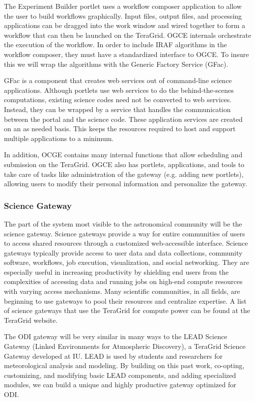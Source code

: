 \documentclass[10pt,conference]{IEEEtran}
\begin{document}
The Experiment Builder portlet uses a workflow composer application to allow the user to build workflows graphically. Input files, output files, and processing applications can be dragged into the work window and wired together to form a workflow that can then be launched on the TeraGrid. OGCE internals orchestrate the execution of the workflow. In order to include IRAF algorithms in the workflow composer, they must have a standardized interface to OGCE. To insure this we will wrap the algorithms with the Generic Factory Service (GFac).
 
GFac is a component that creates web services out of command-line science applications. Although portlets use web services to do the behind-the-scenes computations, existing science codes need not be converted to web services. Instead, they can be wrapped by a service that handles the communication between the portal and the science code. These application services are created on an as needed basis. This keeps the resources required to host and support multiple applications to a minimum.

In addition, OCGE contains many internal functions that allow scheduling and submission on the TeraGrid. OGCE also has portlets, applications, and tools to take care of tasks like administration of the gateway (e.g. adding new portlets), allowing users to modify their personal information and personalize the gateway.

\subsubsection{Science Gateway}

The part of the system most visible to the astronomical community will be the science gateway. Science gateways provide a way for entire communities of users to access shared resources through a customized web-accessible interface. Science gateways typically provide access to user data and data collections, community software, workflows, job execution, visualization, and social networking. They are especially useful in increasing productivity by shielding end users from the complexities of accessing data and running jobs on high-end compute resources with varying access mechanisms.
Many scientific communities, in all fields, are beginning to use gateways to pool their resources and centralize expertise.  A list of science gateways that use the TeraGrid for compute power can be found at the TeraGrid website.  

The ODI gateway will be very similar in many ways to the LEAD Science Gateway (Linked Environments for Atmospheric Discovery), a TeraGrid Science Gateway developed at IU. LEAD is used by students and researchers for meteorological analysis and modeling. By building on this past work, co-opting, customizing, and modifying basic LEAD components, and adding specialized modules, we can build a unique and highly productive gateway optimized for ODI.
\end{document}

